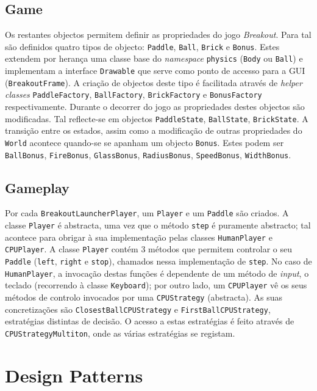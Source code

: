 \documentclass[a4paper]{article}
\begin{document}
\subsection{Game}
Os restantes objectos permitem definir as propriedades do jogo \emph{Breakout}. Para tal são definidos quatro tipos de objecto: \texttt{Paddle}, \texttt{Ball}, \texttt{Brick} e \texttt{Bonus}. Estes extendem por herança uma classe base do \emph{namespace} \texttt{physics} (\texttt{Body} ou \texttt{Ball}) e implementam a interface \texttt{Drawable} que serve como ponto de accesso para a GUI (\texttt{BreakoutFrame}). A criação de objectos deste tipo é facilitada através de \emph{helper classes} \texttt{PaddleFactory}, \texttt{BallFactory}, \texttt{BrickFactory} e \texttt{BonusFactory} respectivamente. Durante o decorrer do jogo as propriedades destes objectos são modificadas. Tal reflecte-se em objectos \texttt{PaddleState}, \texttt{BallState}, \texttt{BrickState}. A transição entre os estados, assim como a modificação de outras propriedades do \texttt{World} acontece quando-se se apanham um objecto \texttt{Bonus}. Estes podem ser \texttt{BallBonus}, \texttt{FireBonus}, \texttt{GlassBonus}, \texttt{RadiusBonus}, \texttt{SpeedBonus}, \texttt{WidthBonus}.

\subsection{Gameplay}
\label{subsec:gameplay}
\noindent Por cada \texttt{BreakoutLauncherPlayer}, um \texttt{Player} e um \texttt{Paddle} são criados. A classe \texttt{Player} é abstracta, uma vez que o método \texttt{step} é puramente abstracto; tal acontece para obrigar à sua implementação pelas classes \texttt{HumanPlayer} e \texttt{CPUPlayer}. A classe \texttt{Player} contém 3 métodos que permitem controlar o seu \texttt{Paddle} (\texttt{left}, \texttt{right} e \texttt{stop}), chamados nessa implementação de \texttt{step}. No caso de \texttt{HumanPlayer}, a invocação destas funções é dependente de um método de \textit{input}, o teclado (recorrendo à classe \texttt{Keyboard}); por outro lado, um \texttt{CPUPlayer} vê os seus métodos de controlo invocados por uma \texttt{CPUStrategy} (abstracta). As suas concretizações são \texttt{ClosestBallCPUStrategy} e \texttt{FirstBallCPUStrategy}, estratégias distintas de decisão. O acesso a estas estratégias é feito através de \texttt{CPUStrategyMultiton}, onde as várias estratégias se registam.

\clearpage

\section{Design Patterns}
\end{document}
